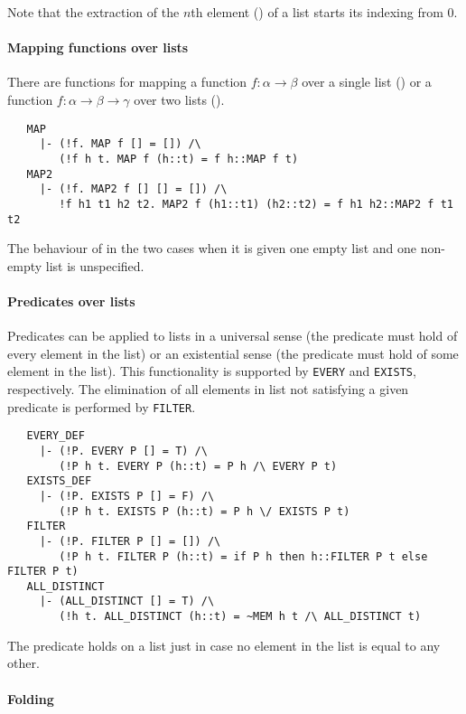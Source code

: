 \noindent
Note that the extraction of the $n$th element () of a
list starts its indexing from 0.

\paragraph {Mapping functions over lists}

There are functions for mapping a function $f : \alpha \to \beta$ over
a single list () or a function $f : \alpha \to \beta
\to \gamma$ over two lists ().
%
{\small
\begin{verbatim}
   MAP
     |- (!f. MAP f [] = []) /\
        (!f h t. MAP f (h::t) = f h::MAP f t)
   MAP2
     |- (!f. MAP2 f [] [] = []) /\
        !f h1 t1 h2 t2. MAP2 f (h1::t1) (h2::t2) = f h1 h2::MAP2 f t1 t2
\end{verbatim}
}
%
The behaviour of  in the two cases when it is given
one empty list and one non-empty list is unspecified.

\paragraph {Predicates over lists}

Predicates can be applied to lists in a universal sense (the predicate
must hold of every element in the list) or an existential sense (the
predicate must hold of some element in the list). This functionality
is supported by {\small\verb+EVERY+} and {\small\verb+EXISTS+},
respectively. The elimination of all elements in list not satisfying
a given predicate is performed by {\small\verb+FILTER+}.
%
{\small
\begin{verbatim}
   EVERY_DEF
     |- (!P. EVERY P [] = T) /\
        (!P h t. EVERY P (h::t) = P h /\ EVERY P t)
   EXISTS_DEF
     |- (!P. EXISTS P [] = F) /\
        (!P h t. EXISTS P (h::t) = P h \/ EXISTS P t)
   FILTER
     |- (!P. FILTER P [] = []) /\
        (!P h t. FILTER P (h::t) = if P h then h::FILTER P t else FILTER P t)
   ALL_DISTINCT
     |- (ALL_DISTINCT [] = T) /\
        (!h t. ALL_DISTINCT (h::t) = ~MEM h t /\ ALL_DISTINCT t)
\end{verbatim}
}
%
The predicate  holds on a list  just
in case no element in the list is equal to any other.

\paragraph {Folding}

